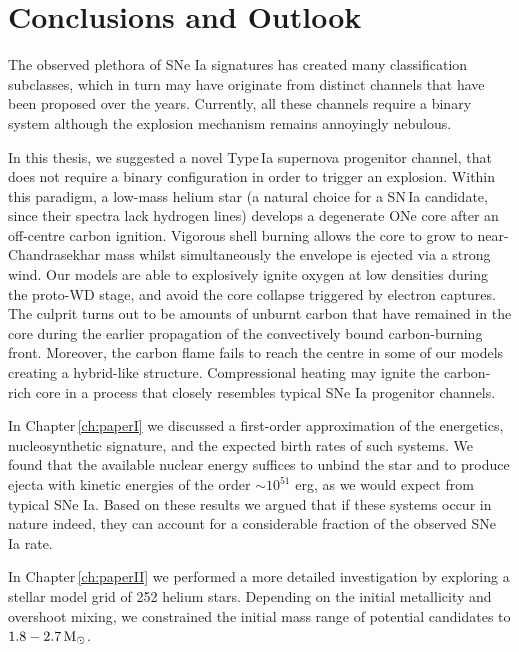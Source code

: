 \documentclass[../../main/thesis_msc.tex]{subfiles}
\begin{document}
\chapter{Conclusions and Outlook}\label{ch:conclusions}
	
		The observed plethora of SNe Ia signatures has created many classification subclasses, which in turn may have originate from distinct channels that have been proposed over the years. Currently, all these channels require a binary system although the explosion mechanism remains annoyingly nebulous. 


		In this thesis, we suggested a novel Type\,Ia supernova progenitor channel, that does not require a binary configuration in order to trigger an explosion. Within this paradigm, a low-mass helium star (a natural choice for a SN\,Ia candidate, since their spectra lack hydrogen lines) develops a degenerate ONe core after an off-centre carbon ignition. Vigorous shell burning allows the core to grow to near-Chandrasekhar mass whilst simultaneously the envelope is ejected via a strong wind. Our models are able to explosively ignite oxygen at low densities during the proto-WD stage, and avoid the core collapse triggered by electron captures. The culprit turns out to be amounts of unburnt carbon that have remained in the core during the earlier propagation of the convectively bound carbon-burning front.
		Moreover, the carbon flame fails to reach the centre in some of our models creating a hybrid-like structure. Compressional heating may ignite the carbon-rich core in a process that closely resembles typical SNe Ia progenitor channels.
		
		
		In Chapter\,\ref{ch:paperI} we discussed a first-order approximation of the energetics, nucleosynthetic signature, and the expected birth rates of such systems. We found that the available nuclear energy suffices to unbind the star and to produce ejecta with kinetic energies of the order $\sim 10^{51}$ erg, as we would expect from typical SNe Ia. Based on these results we argued that if these systems occur in nature indeed, they can account for a considerable fraction of the observed SNe Ia rate.
		
		In Chapter\,\ref{ch:paperII} we performed a more detailed investigation by exploring a stellar model grid of 252 helium stars. Depending on the initial metallicity and overshoot mixing, we constrained the initial mass range of potential candidates to $\rm 1.8 - 2.7\, M_{\odot}$.
		
		
		
\end{document}
